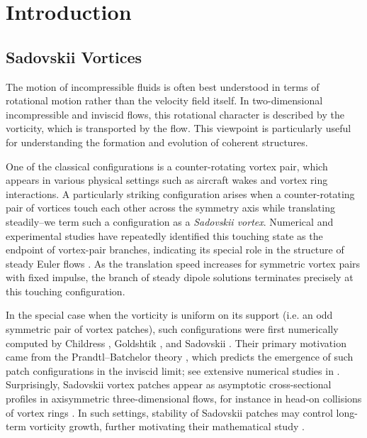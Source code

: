 \documentclass[11pt]{amsart}
\theoremstyle{definition}
\theoremstyle{definition}
\numberwithin{equation}{section}
\newcommand{\0}{\emptyset}
\begin{document}
	
	\tableofcontents 
	
	\section{Introduction} 
	
	\subsection{Sadovskii Vortices}
	
	The motion of incompressible fluids is often best understood in terms of rotational motion rather than the velocity field itself.
	In two-dimensional incompressible and inviscid flows, this rotational character is described by the vorticity, which is transported by the flow.
	This viewpoint is particularly useful for understanding the formation and evolution of coherent structures. 
	
	One of the classical configurations is a counter-rotating vortex pair, which appears in various physical settings such as aircraft wakes and vortex ring interactions.
	A particularly striking configuration arises when a counter-rotating pair of vortices touch each other across the symmetry axis while translating steadily--we term such a configuration as a \textit{Sadovskii vortex}.
	Numerical and experimental studies have repeatedly identified this touching state as the endpoint of vortex-pair branches, indicating its special role in the structure of steady Euler flows \cite{FW2012, LDW2016}.
	As the translation speed increases for symmetric vortex pairs with fixed impulse, the branch of steady dipole solutions terminates precisely at this touching configuration.
	
	In the special case when the vorticity is uniform on its support (i.e. an odd symmetric pair of vortex patches), such configurations were first numerically computed by Childress \cite{Child1966}, Goldshtik \cite{Gold}, and Sadovskii \cite{Sad1971}. Their primary motivation came from the Prandtl--Batchelor theory \cite{Pra,Bat}, which predicts the emergence of such patch configurations in the inviscid limit; see extensive numerical studies in \cite{McL,Chernyshenko1993,Chernyshenko.1988}. Surprisingly, Sadovskii vortex patches appear as asymptotic cross-sectional profiles in axisymmetric three-dimensional flows, for instance in head-on collisions of vortex rings \cite{Childress.2007,Childress.2008,CG2018, Car2002, SLF2008, CGV2016, CJ2021, GMT2023, LJ2025}.
	In such settings, stability of Sadovskii patches may control long-term vorticity growth, further motivating their mathematical study \cite{CJS2025,HT2025}. 
	
\end{document}
